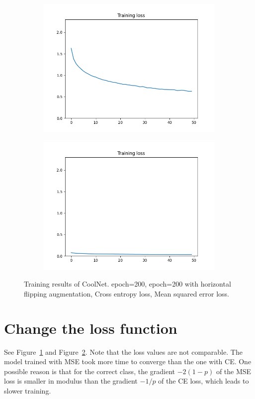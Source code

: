 \documentclass[12pt]{article}
\begin{document}
\begin{figure}
\begin{subfigure}{0.24\textwidth}
    \includegraphics[width=\linewidth]{loss_2_3_bs4.png}
    \caption{}
    \label{fig:5_ce}
  \end{subfigure}
  \begin{subfigure}{0.24\textwidth}
    \centering
    \includegraphics[width=\linewidth]{loss_5_mse.png}
    \caption{}
    \label{fig:5_mse}
  \end{subfigure}
  \caption{Training results of CoolNet.  epoch=200,  epoch=200 with horizontal flipping augmentation,  Cross entropy loss,  Mean squared error loss.}
  \label{fig:45}
\end{figure}

\section{Change the loss function}
See Figure~\ref{fig:5_ce} and Figure~\ref{fig:5_mse}. Note that the loss values are not comparable. The model trained with MSE took more time to converge than the one with CE. One possible reason is that for the correct class, the gradient $-2(1-p)$ of the MSE loss is smaller in modulus than the gradient $-1/p$ of the CE loss, which leads to slower training.



\end{document}
